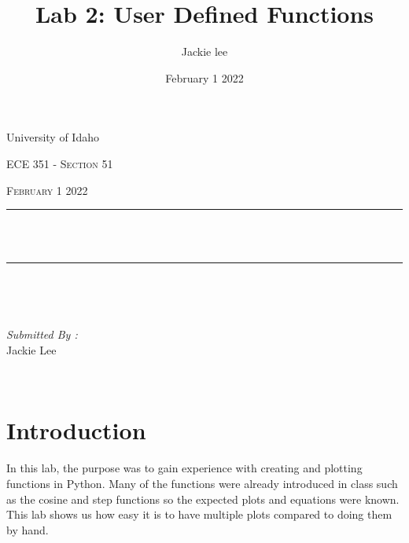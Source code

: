 \documentclass[12pt]{report}
\title{Lab 2: User Defined Functions}
\author{ Jackie lee}
\date{February 1 2022}
\makeatletter
\let\thetitle\@title
\makeatother
\begin{document}
\begin{titlepage}
\centering
\vspace*{0.5 cm}
University of Idaho
\begin{center}    \textsc{\Large   ECE 351 - Section 51 \ }\\[2.0 cm]
\end{center}%
\textsc{\Large February 1 2022  }\\[0.5 cm] %
\rule{\linewidth}{0.2 mm} \\[0.4 cm]
{ \huge \bfseries \thetitle}\\
\rule{\linewidth}{0.2 mm} \\[1.5 cm]
\begin{minipage}{0.4\textwidth}
\begin{flushleft} \large
\end{flushleft}
\end{minipage}~
\begin{minipage}{0.4\textwidth}
\begin{flushright} \large
\emph{Submitted By :} \\
Jackie Lee
\end{flushright}
\end{minipage}\\[2 cm]
\end{titlepage}
\tableofcontents
\pagebreak
\renewcommand{\thesection}{\arabic{section}}
\section{Introduction}
In this lab, the purpose was to gain experience with creating and plotting functions 
in Python. Many of the functions were already introduced in class such as the cosine and step functions
so the expected plots and equations were known. This lab shows us how easy it is to have multiple plots
compared to doing them by hand. 
\end{document}
